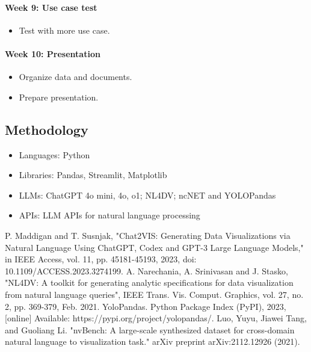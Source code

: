 \documentclass[conference]{IEEEtran}
\begin{document}
            \paragraph{Week 9: Use case test}
                \begin{itemize}
                    \item Test with more use case.
                \end{itemize}

            \paragraph{Week 10: Presentation}
                \begin{itemize}
                    \item Organize data and documents.
                    \item Prepare presentation.
                \end{itemize}


    \subsection{Methodology}
        \begin{itemize}
            \item Languages: Python
            \item Libraries: Pandas, Streamlit, Matplotlib
            \item LLMs: ChatGPT 4o mini, 4o, o1; NL4DV; ncNET and YOLOPandas
            \item APIs: LLM APIs for natural language processing 
        \end{itemize}





\begin{thebibliography}{00}
     P. Maddigan and T. Susnjak, "Chat2VIS: Generating Data Visualizations via Natural Language Using ChatGPT, Codex and GPT-3 Large Language Models," in IEEE Access, vol. 11, pp. 45181-45193, 2023, doi: 10.1109/ACCESS.2023.3274199.
     A. Narechania, A. Srinivasan and J. Stasko, "NL4DV: A toolkit for generating analytic specifications for data visualization from natural language queries", IEEE Trans. Vis. Comput. Graphics, vol. 27, no. 2, pp. 369-379, Feb. 2021.
     YoloPandas. Python Package Index (PyPI), 2023, [online] Available: https://pypi.org/project/yolopandas/.
     Luo, Yuyu, Jiawei Tang, and Guoliang Li. "nvBench: A large-scale synthesized dataset for cross-domain natural language to visualization task." arXiv preprint arXiv:2112.12926 (2021).
\end{thebibliography}
\end{document}
